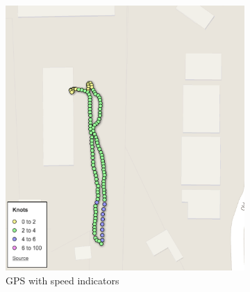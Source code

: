 \documentclass[heading.tex]{subfiles}
\begin{document}
\begin{figure} [hbtp]
        \centering
        ~ %
        \begin{subfigure}[b]{0.45\textwidth}
                \includegraphics[width=\textwidth]{images/gps1.png}
                \caption{GPS with speed indicators}
                \label{fig:gps}
        \end{subfigure}
        ~ %
        \begin{subfigure}[b]{0.45\textwidth}

\end{subfigure}
\end{figure}
\end{document}
